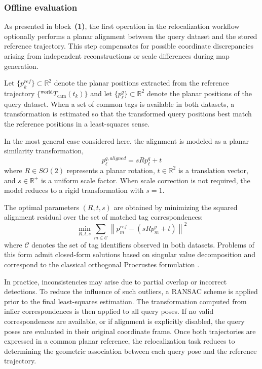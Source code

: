 \documentclass[a4paper,11pt]{article}
\begin{document}
\subsubsection{Offline evaluation}
\label{subsubsec:relocal_offline}

As presented in block~\textbf{(1)}, the first operation in the relocalization workflow optionally performs a planar alignment between the query dataset and the stored reference trajectory. This step compensates for possible coordinate discrepancies arising from independent reconstructions or scale differences during map generation.

Let $\{p_k^{ref}\}\subset\mathbb{R}^2$ denote the planar positions extracted from the reference trajectory $\{{}^{\text{world}}\!T_{\text{cam}}(t_k)\}$ and let $\{p_\ell^{q}\}\subset\mathbb{R}^2$ denote the planar positions of the query dataset. When a set of common tags is available in both datasets, a transformation is estimated so that the transformed query positions best match the reference positions in a least-squares sense.

In the most general case considered here, the alignment is modeled as a planar similarity transformation,
\begin{equation}
	p_\ell^{q,aligned}
	=
	s R p_\ell^{q} + t
	\label{eq:relocal_similarity}
\end{equation}
where $R \in SO(2)$ represents a planar rotation, $t \in \mathbb{R}^2$ is a translation vector, and $s \in \mathbb{R}^{+}$ is a uniform scale factor. When scale correction is not required, the model reduces to a rigid transformation with $s=1$.

The optimal parameters $(R,t,s)$ are obtained by minimizing the squared alignment residual over the set of matched tag correspondences:
\begin{equation}
	\min_{R,t,s}
	\sum_{m \in \mathcal{C}}
	\left\|
	p_m^{ref}
	-
	\left(s R p_m^{q} + t\right)
	\right\|^2 
	\label{eq:relocal_alignment_ls}
\end{equation}
where $\mathcal{C}$ denotes the set of tag identifiers observed in both datasets. Problems of this form admit closed-form solutions based on singular value decomposition and correspond to the classical orthogonal Procrustes formulation \cite{Schoenemann1966}. 

In practice, inconsistencies may arise due to partial overlap or incorrect detections. To reduce the influence of such outliers, a RANSAC scheme \cite{Fischler1981} is applied prior to the final least-squares estimation. The transformation computed from inlier correspondences is then applied to all query poses. If no valid correspondences are available, or if alignment is explicitly disabled, the query poses are evaluated in their original coordinate frame. Once both trajectories are expressed in a common planar reference, the relocalization task reduces to determining the geometric association between each query pose and the reference trajectory.
\end{document}
